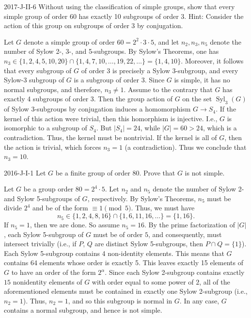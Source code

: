 \documentclass{article}
\begin{document}
	\begin{prb}{2017-J-II-6}
		Without using the classification of simple groups, show that every simple group of order 60 has exactly 10 subgroups of order 3. Hint: Consider the action of this group on subgroups of order 3 by conjugation. 
	\end{prb}
	
	Let $G$ denote a simple group of order $60 = 2^{2} \cdot 3 \cdot 5$, and let $n_{2}, n_{3}, n_{5}$ denote the number of Sylow 2-, 3-, and 5-subgroups. By Sylow's Theorems, one has $n_{3} \in \{1, 2, 4, 5, 10, 20\} \cap \{1, 4, 7, 10, \ldots, 19, 22, \ldots\} = \{1, 4, 10\}$. Moreover, it follows that every subgroup of $G$ of order 3 is precisely a Sylow 3-subgroup, and every Sylow-3 subgroup of $G$ is a subgroup of order 3. Since $G$ is simple, it has no normal subgroups, and therefore, $n_{3} \neq 1$. Assume to the contrary that $G$ has exactly 4 subgroups of order 3. Then the group action of $G$ on the set $\operatorname{Syl}_{3}(G)$ of Sylow 3-subgroups by conjugation induces a homomorphism $G \to S_{4}$. If the kernel of this action were trivial, then this homorphism is injective. I.e., $G$ is isomorphic to a subgroup of $S_{4}$. But $|S_{4}| = 24$, while $|G| = 60 > 24$, which is a contradiction. Thus, the kernel must be nontrivial. If the kernel is all of $G$, then the action is trivial, which forces $n_{3} = 1$ (a contradiction). Thus we conclude that $n_{3} = 10$. 
	
	\begin{prb}{2016-J-I-1}
		Let $G$ be a finite group of order 80. Prove that $G$ is not simple. 
	\end{prb}
	
	Let $G$ be a group order $80 = 2^{4} \cdot 5$. Let $n_{2}$ and $n_{5}$ denote the number of Sylow 2- and Sylow 5-subgroups of $G$, respectively. By Sylow's Theorems, $n_{5}$ must be divide $2^{4}$ and be of the form $\equiv 1 \pmod{5}$. Thus, we must have 
	\begin{equation*}
		n_{5} \in \{1, 2, 4, 8, 16\} \cap \{1, 6, 11, 16, \ldots\} = \{1, 16\}. 
	\end{equation*}
	If $n_{5} = 1$, then we are done. So assume $n_{5} = 16$. By the prime factorization of $|G|$, each Sylow 5-subgroup of $G$ must be of order $5$, and consequently, must intersect trivially (i.e., if $P$, $Q$ are distinct Sylow 5-subgroups, then $P \cap Q = \{1\}$). Each Sylow 5-subgroup contains 4 non-identity elements. This means that $G$ contains 64 elements whose order is exactly 5. This leaves exactly 15 elements of $G$ to have an order of the form $2^{\alpha}$. Since each Sylow 2-subgroup contains exactly $15$ nonidentity elements of $G$ with order equal to some power of $2$, all of the aforementioned elements must be contained in exactly one Sylow 2-subgroup (i.e., $n_{2} = 1$). Thus, $n_{2} = 1$, and so this subgroup is normal in $G$. In any case, $G$ contains a normal subgroup, and hence is not simple. 
	
\end{document}
